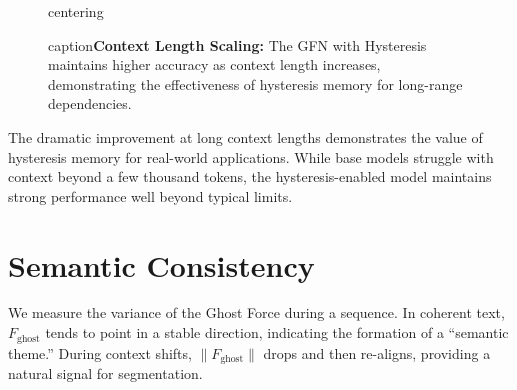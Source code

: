 \documentclass[12pt,a4paper]{article}
\begin{document}
\begin{figure}[htbp]
centering
caption{\textbf{Context Length Scaling:} The GFN with Hysteresis maintains 
         higher accuracy as context length increases, demonstrating the 
         effectiveness of hysteresis memory for long-range dependencies.}
\label{fig:context_scaling}
\end{figure}

The dramatic improvement at long context lengths demonstrates the value of hysteresis memory for real-world applications. While base models struggle with context beyond a few thousand tokens, the hysteresis-enabled model maintains strong performance well beyond typical limits.

\section{Semantic Consistency}

We measure the variance of the Ghost Force during a sequence. In coherent text, $F_{\text{ghost}}$ tends to point in a stable direction, indicating the formation of a ``semantic theme.'' During context shifts, $\|F_{\text{ghost}}\|$ drops and then re-aligns, providing a natural signal for segmentation.
\end{document}
